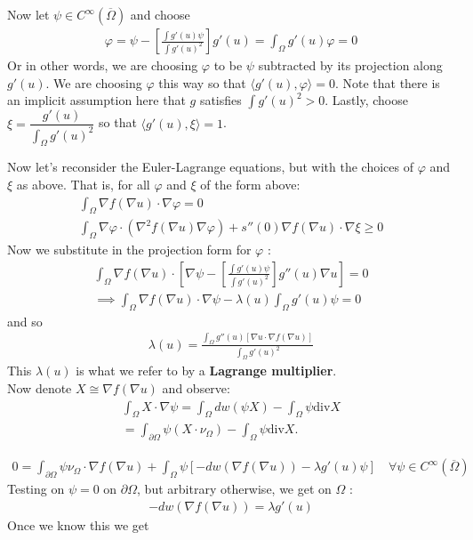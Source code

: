 \documentclass{memoir}
\begin{document}
\hrulefill

Now let \(\psi \in C^{\infty}(\overline{\Omega })\) and choose
\begin{align*}
	\varphi = \psi - \left[ \frac{\int g '(u) \psi }{\int  g '(u)^2} \right] g'(u) = \int_\Omega g'(u)\varphi =0
\end{align*}
Or in other words, we are choosing \(\varphi \) to be \(\psi \) subtracted by its projection along \(g'(u)\). We are choosing \(\varphi \) this way so that \(\langle g'(u), \varphi  \rangle = 0\). Note that there is an implicit assumption here that \(g\) satisfies \(\int g '(u)^2 > 0\). Lastly, choose \(\xi = \dfrac{g'(u)}{\int_\Omega g'(u)^2}\) so that \(\langle g'(u),\xi  \rangle= 1\).

Now let's reconsider the Euler-Lagrange equations, but with the choices of \(\varphi \) and \(\xi \) as above. That is, for all \(\varphi \) and \(\xi \) of the form above:
\begin{align*}
	\int_\Omega \nabla f(\nabla u)\cdot \nabla \varphi = 0\\
	\int_\Omega \nabla \varphi \cdot (\nabla^2f(\nabla u)\nabla \varphi ) + s''(0) \nabla f(\nabla u)\cdot \nabla \xi \geq 0
\end{align*}
Now we substitute in the projection form for \(\varphi \) :
\begin{align*}
	\int_\Omega \nabla f ( \nabla u) \cdot \left[ \nabla \psi - \left[ \frac{\int g'(u) \psi }{\int g'(u)^2} \right] g''(u) \nabla u \right]= 0 \\
\implies \int_\Omega \nabla f(\nabla u)\cdot \nabla \psi - \lambda (u) \int_\Omega g'(u) \psi = 0
\end{align*}
and so
\begin{align*}
	\lambda (u) = \frac{\int_\Omega g''(u) \left[ \nabla u \cdot \nabla f(\nabla u) \right] }{\int_\Omega g'(u)^2}
\end{align*}
This \(\lambda(u)\) is what we refer to by a \textbf{Lagrange multiplier}.\\

Now denote \(X \cong \nabla f(\nabla u)\) and observe:
\begin{align*}
	\int_\Omega X \cdot \nabla \psi = \int_\Omega dw(\psi X) - \int_\Omega \psi \textrm{div}X\\
	= \int_{\partial\Omega }\psi (X\cdot \nu_\Omega ) - \int_\Omega \psi \textrm{div}X.
\end{align*}

\begin{align*}
	0 = \int_{\partial\Omega }\psi \nu_\Omega \cdot \nabla f(\nabla u) + \int_\Omega \psi \left[ -dw(\nabla f(\nabla u)) - \lambda g'(u) \psi  \right] \quad \forall \psi \in C^{\infty}(\overline{\Omega })
\end{align*}
Testing on \(\psi =0\) on \(\partial\Omega \), but arbitrary otherwise, we get on \(\Omega \) :
\begin{align*}
	-dw(\nabla f(\nabla u)) = \lambda g'(u)
\end{align*}
Once we know this we get
\end{document}
